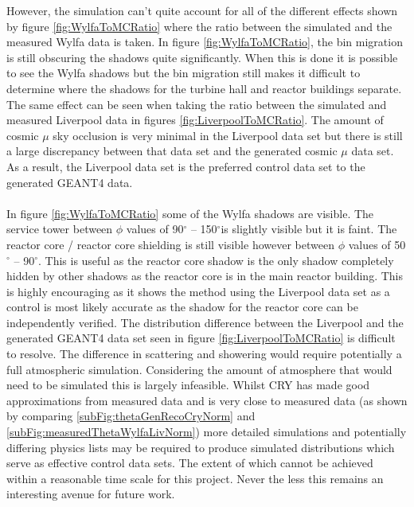 However, the simulation can't quite account for all of the different effects shown by figure \ref{fig:WylfaToMCRatio} where the ratio between the simulated and the measured Wylfa data is taken. In figure \ref{fig:WylfaToMCRatio}, the bin migration is still obscuring the shadows quite significantly. When this is done it is possible to see the Wylfa shadows but the bin migration still makes it difficult to determine where the shadows for the turbine hall and reactor buildings separate. The same effect can be seen when taking the ratio between the simulated and measured Liverpool data in figures \ref{fig:LiverpoolToMCRatio}. The amount of cosmic $\mu$ sky occlusion is very minimal in the Liverpool data set but there is still a large discrepancy between that data set and the generated cosmic $\mu$ data set. As a result, the Liverpool data set is the preferred control data set to the generated GEANT4 data. 
\\\\ In figure \ref{fig:WylfaToMCRatio} some of the Wylfa shadows are visible. The service tower between $\phi$ values of 90$^\circ$ -- 150$^\circ$is slightly visible but it is faint. The reactor core / reactor core shielding is still visible however between $\phi$ values of 50$^\circ$ -- 90$^\circ$. This is useful as the reactor core shadow is the only shadow completely hidden by other shadows as the reactor core is in the main reactor building. This is highly encouraging as it shows the method using the Liverpool data set as a control is most likely accurate as the shadow for the reactor core can be independently verified. The distribution difference between the Liverpool and the generated GEANT4 data set seen in figure \ref{fig:LiverpoolToMCRatio} is difficult to resolve. The difference in scattering and showering would require potentially a full atmospheric simulation. Considering the amount of atmosphere that would need to be simulated this is largely infeasible. Whilst CRY has made good approximations from measured data and is very close to measured data (as shown by comparing \ref{subFig:thetaGenRecoCryNorm} and \ref{subFig:measuredThetaWylfaLivNorm}) more detailed simulations and potentially differing physics lists may be required to produce simulated distributions which serve as effective control data sets. The extent of which cannot be achieved within a reasonable time scale for this project. Never the less this remains an interesting avenue for future work. 


